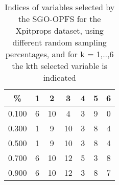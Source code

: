 \begin{table}
	\begin{center}
		\begin{tabular}{c c c c c c c}
			\% & 1 & 2 & 3 & 4 & 5 & 6 \\
			\hline
			0.100 & 6 & 10 & 4 & 3 & 9 & 0 \\
			0.300 & 1 & 9 & 10 & 3 & 8 & 4 \\
			0.500 & 1 & 9 & 10 & 3 & 8 & 4 \\
			0.700 & 6 & 10 & 12 & 5 & 3 & 8 \\
			0.900 & 6 & 10 & 12 & 3 & 8 & 7 \\
		\end{tabular}
	\end{center}
	\caption{Indices of variables selected by the SGO-OPFS for the Xpitprops dataset, using different random sampling percentages, and for k = 1,..,6 the kth selected variable is indicated}
\end{table}